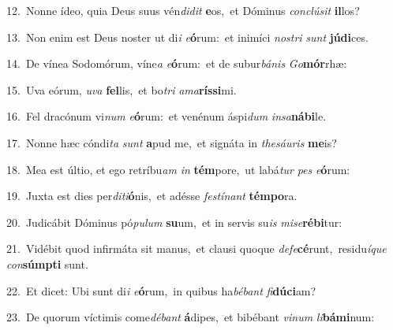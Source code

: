 {\numbfont\textcolor{\numbcolor}{12.}}~Nonne ídeo, quia Deus suus vén\-\textit{di}\-\textit{dit} \textbf{e}\-os,~\star et Dóminus \textit{con}\-\textit{clú}\textit{sit} \textbf{il}\-los?\par
{\numbfont\textcolor{\numbcolor}{13.}}~Non enim est Deus noster ut di\textit{i} \textit{e}\-\textbf{ó}rum:~\star et inimíci \textit{nos}\-\textit{tri} \textit{sunt} \textbf{jú}\-\textbf{di}ces.\par
{\numbfont\textcolor{\numbcolor}{14.}}~De vínea Sodomórum, víne\textit{a} \textit{e}\-\textbf{ó}rum:~\star et de subur\-\textit{bá}\-\textit{nis} \textit{Go}\-\textbf{mór}rhæ:\par
{\numbfont\textcolor{\numbcolor}{15.}}~Uva eórum, \textit{u}\-\textit{va} \textbf{fel}\-lis,~\star et bo\textit{tri} \textit{a}\-\textit{ma}\textbf{rís}\textbf{si}mi.\par
{\numbfont\textcolor{\numbcolor}{16.}}~Fel dracónum vi\textit{num} \textit{e}\-\textbf{ó}rum:~\star et venénum áspi\textit{dum} \textit{in}\-\textit{sa}\textbf{ná}\textbf{bi}le.\par
{\numbfont\textcolor{\numbcolor}{17.}}~Nonne hæc cóndi\textit{ta} \textit{sunt} \textbf{a}\-pud me,~\star et signáta in \textit{the}\-\textit{sáu}\textit{ris} \textbf{me}\-is?\par
{\numbfont\textcolor{\numbcolor}{18.}}~Mea est últio, et ego retríbu\textit{am} \textit{in} \textbf{tém}\-pore,~\star ut labá\textit{tur} \textit{pes} \textit{e}\-\textbf{ó}rum:\par
{\numbfont\textcolor{\numbcolor}{19.}}~Juxta est dies per\-\textit{di}\-\textit{ti}\textbf{ó}nis,~\star et adésse \textit{fes}\-\textit{tí}\textit{nant} \textbf{tém}\-\textbf{po}ra.\par
{\numbfont\textcolor{\numbcolor}{20.}}~Judicábit Dóminus pó\-\textit{pu}\-\textit{lum} \textbf{su}\-um,~\star et in servis su\textit{is} \textit{mi}\-\textit{se}\textbf{ré}\textbf{bi}tur:\par
{\numbfont\textcolor{\numbcolor}{21.}}~Vidébit quod infirmáta sit manus,~\dagger et clausi quoque \textit{de}\-\textit{fe}\textbf{cé}runt,~\star residu\-\textit{í}\-\textit{que} \textit{con}\-\textbf{súmp}\textbf{ti} sunt.\par
{\numbfont\textcolor{\numbcolor}{22.}}~Et dicet: Ubi sunt di\textit{i} \textit{e}\-\textbf{ó}rum,~\star in quibus ha\-\textit{bé}\-\textit{bant} \textit{fi}\-\textbf{dú}\textbf{ci}am?\par
{\numbfont\textcolor{\numbcolor}{23.}}~De quorum víctimis come\-\textit{dé}\-\textit{bant} \textbf{á}\-dipes,~\star et bibébant \textit{vi}\-\textit{num} \textit{li}\-\textbf{bá}\textbf{mi}num:\par
